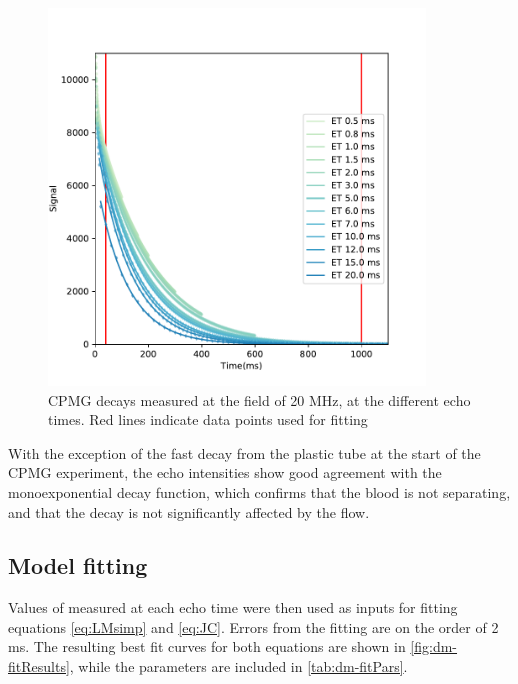 \begin{figure}[h]
\centering
\includegraphics[width=10cm]{figures/diffmodels/20MHzT2fit.pdf}

\caption{CPMG decays measured at the field of 20 MHz, at the different echo times. Red lines indicate data points used for fitting}
\label{fig:dm-CPMGdecay}
\end{figure}

With the exception of the fast decay from the plastic tube at the start of the CPMG experiment, the echo intensities show good agreement with the monoexponential decay function, which confirms that the blood is not separating, and that the decay is not significantly affected by the flow.

\subsection{Model fitting}

Values of \Ttwo measured at each echo time were then used as inputs for fitting equations \ref{eq:LMsimp} and \ref{eq:JC}.
Errors from the \Ttwo fitting are on the order of 2 ms.
The resulting best fit curves for both equations are shown in \autoref{fig:dm-fitResults}, while the parameters are included in \autoref{tab:dm-fitPars}.

